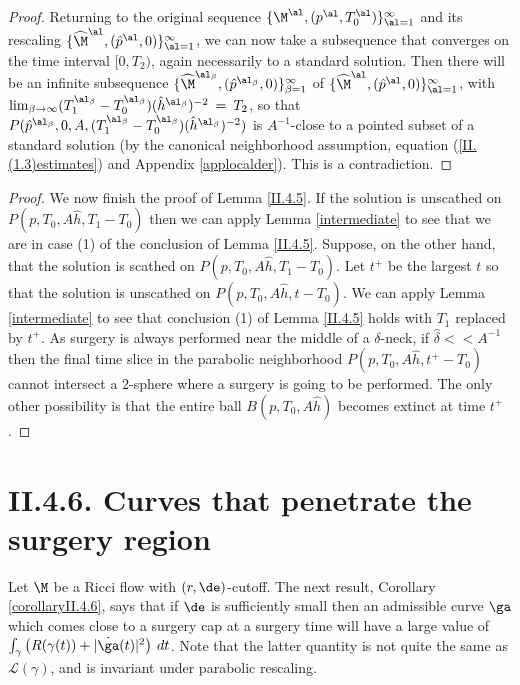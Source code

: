 \begin{proof}

Returning to the original sequence
$\{\M^\al, (p^\al,T_0^\al) \}_{\al = 1}^\infty$ and its rescaling
$\{ \widehat{\M}^\al, (\hat{p}^\al,0) \}_{\al = 1}^\infty$, we can now
take a subsequence that converges on the time interval $[0, T_2)$,
again necessarily to a standard solution.  Then there will be
an infinite subsequence
$\{ \widehat{\M}^{\al_\beta}, (\hat{p}^{\al_\beta},0) \}_{\beta = 1}^\infty$
of
$\{ \widehat{\M}^{\al}, (\hat{p}^{\al},0) \}_{\al = 1}^\infty$,
with
$\lim_{\beta \rightarrow \infty}
(T_1^{\al_\beta} - T_0^{\al_\beta})(\hat{h}^{\al_\beta})^{-2} \: = \: T_2$,
so that $P(\hat{p}^{\al_\beta}, 0, A, (T_1^{\al_\beta} - T_0^{\al_\beta})
(\hat{h}^{\al_\beta})^{-2})$
is $A^{-1}$-close to a pointed
subset of a standard solution (by the canonical
neighborhood assumption, equation
(\ref{II.(1.3)estimates}) and Appendix \ref{applocalder}).
This is a contradiction.
\end{proof}
\begin{proof}

We now finish the proof of Lemma \ref{II.4.5}. If the solution is
unscathed on $P(p,T_0,A\hat h,T_1-T_0)$ then we can apply
Lemma \ref{intermediate} to see
that we are in case (1) of the conclusion of Lemma \ref{II.4.5}.
Suppose, on the other hand,
that the solution is scathed on $P(p,T_0,A\hat h,T_1-T_0)$. Let
$t^+$ be the largest $t$ so that the solution is unscathed on
$P(p,T_0,A\hat h,t-T_0)$.
We can apply
Lemma \ref{intermediate} to
see that conclusion (1) of Lemma \ref{II.4.5}
holds with $T_1$ replaced by $t^+$.
As surgery is always performed near the middle of a $\delta$-neck,
if $\hat \delta << A^{-1}$ then the final time slice in the parabolic
neighborhood $P(p,T_0,A\hat h,t^+-T_0)$ cannot intersect a
$2$-sphere where a surgery is going to be performed.
The only other possibility is that
the entire ball $B(p,T_0,A\hat h)$ becomes extinct at time $t^+$.
\end{proof}

\section{II.4.6. Curves that penetrate the surgery region}
\label{II.4.6}

Let $\M$ be a Ricci flow with $(r,\de)$-cutoff.
The next result, Corollary \ref{corollaryII.4.6}, says that if $\de$ is sufficiently small
then an admissible curve $\ga$ which comes close
to a surgery cap at a surgery time will have a large value
of $\int_\gamma \left( R(\gamma(t))+|\dot{\ga}(t)|^2 \right) \: dt$.
Note that the latter quantity is not quite the same as
${\mathcal L}(\gamma)$, and is invariant under parabolic rescaling.


